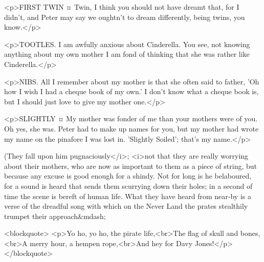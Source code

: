 <p>FIRST TWIN ¤
Twin, I think you should not have dreamt that, for I didn't, and Peter may say we oughtn't to dream differently, being twins, you know.</p>

<p>TOOTLES. I am awfully anxious about Cinderella. You see, not knowing anything about my own mother I am fond of thinking that she was rather like Cinderella.</p>


<p>NIBS. All I remember about my mother is that she often said to father, 'Oh how I wish I had a cheque book of my own.' I don't know what a cheque book is, but I should just love to give my mother one.</p>

<p>SLIGHTLY ¤
My mother was fonder of me than your mothers were of you.
Oh yes, she was. Peter had to make up names for you, but my mother had wrote my name on the pinafore I was lost in. 'Slightly Soiled'; that's my name.</p>

\begin{stagedir}
(They fall upon him pugnaciously</i>; <i>not that they are really worrying about their mothers, who are now as important to them as a piece of string, but because any excuse is good enough for a shindy. Not for long is he belaboured, for a sound is heard that sends them scurrying down their holes; in a second of time the scene is bereft of human life. What they have heard from near-by is a verse of the dreadful song with which on the Never Land the prates stealthily trumpet their approach&mdash;
\end{stagedir}

<blockquote> <p>Yo ho, yo ho, the pirate life,<br>The flag of skull and bones,<br>A merry hour, a hempen rope,<br>And hey for Davy Jones!</p> </blockquote>

